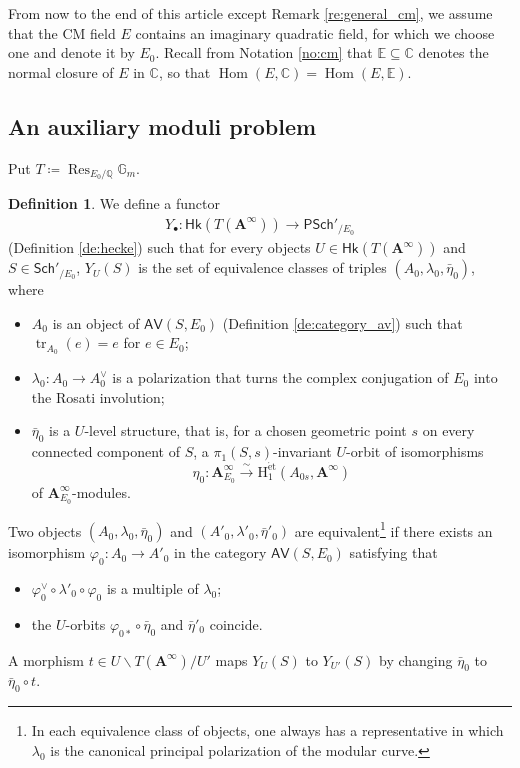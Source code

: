 \documentclass[12pt]{amsart}
\numberwithin{equation}{section}
\theoremstyle{plain}
\theoremstyle{definition}
\newtheorem{definition}[proposition]{Definition}
\theoremstyle{remark}
\renewcommand{\b}[1]{\mathbf{#1}}
\renewcommand{\d}[1]{\mathbb{#1}}
\renewcommand{\r}[1]{\mathrm{#1}}
\renewcommand{\sf}[1]{\mathsf{#1}}
\renewcommand{\(}{\left(}
\renewcommand{\)}{\right)}
\newcommand{\bA}{\b A}
\newcommand{\dC}{\d C}
\newcommand{\dE}{\d E}
\newcommand{\dG}{\d G}
\newcommand{\dQ}{\d Q}
\newcommand{\rH}{\r H}
\newcommand{\sfP}{\sf P}
\newcommand{\et}{{\acute{\r{e}}\r{t}}}
\newcommand{\Sch}{\sf{Sch}}
\newcommand{\AV}{\sf{AV}}
\newcommand{\Hk}{\sf{Hk}}
\DeclareMathOperator{\Hom}{Hom}
\DeclareMathOperator{\Res}{Res}
\DeclareMathOperator{\tr}{tr}
\begin{document}
From now to the end of this article except Remark \ref{re:general_cm}, we assume that the CM field $E$ contains an imaginary quadratic field, for which we choose one and denote it by $E_0$. Recall from Notation \ref{no:cm} that $\dE\subseteq\dC$ denotes the normal closure of $E$ in $\dC$, so that $\Hom(E,\dC)=\Hom(E,\dE)$.


\subsection{An auxiliary moduli problem}
\label{ss:auxiliary_moduli}

Put $T\coloneqq\Res_{E_0/\dQ}\dG_m$.

\begin{definition}\label{de:moduli_auxiliary}
We define a functor
\begin{align*}
Y_\bullet\colon\Hk(T(\bA^\infty))\to\sfP\Sch'_{/E_0}
\end{align*}
(Definition \ref{de:hecke}) such that for every objects $U\in\Hk(T(\bA^\infty))$ and $S\in\Sch'_{/E_0}$, $Y_U(S)$ is the set of equivalence classes of triples $(A_0,\lambda_0,\bar\eta_0)$, where
\begin{itemize}
  \item $A_0$ is an object of $\AV(S,E_0)$ (Definition \ref{de:category_av}) such that $\tr_{A_0}(e)=e$ for $e\in E_0$;

  \item $\lambda_0\colon A_0\to A_0^\vee$ is a polarization that turns the complex conjugation of $E_0$ into the Rosati involution;

  \item $\bar\eta_0$ is a $U$-level structure, that is, for a chosen geometric point $s$ on every connected component of $S$, a $\pi_1(S,s)$-invariant $U$-orbit of isomorphisms
      \[
      \eta_0\colon\bA_{E_0}^\infty\xrightarrow\sim\rH_1^{\et}(A_{0s},\bA^\infty)
      \]
      of $\bA_{E_0}^\infty$-modules.
\end{itemize}
Two objects $(A_0,\lambda_0,\bar\eta_0)$ and $(A'_0,\lambda'_0,\bar\eta'_0)$ are equivalent\footnote{In each equivalence class of objects, one always has a representative in which $\lambda_0$ is the canonical principal polarization of the modular curve.} if there exists an isomorphism $\varphi_0\colon A_0\to A'_0$ in the category $\AV(S,E_0)$ satisfying that
\begin{itemize}
  \item $\varphi_0^\vee\circ\lambda'_0\circ\varphi_0$ is a multiple of $\lambda_0$;

  \item the $U$-orbits $\varphi_{0*}\circ\bar\eta_0$ and $\bar\eta'_0$ coincide.
\end{itemize}
A morphism $t\in U\backslash T(\bA^\infty)/U'$ maps $Y_U(S)$ to $Y_{U'}(S)$ by changing $\bar\eta_0$ to $\bar\eta_0\circ t$.
\end{definition}
\end{document}
